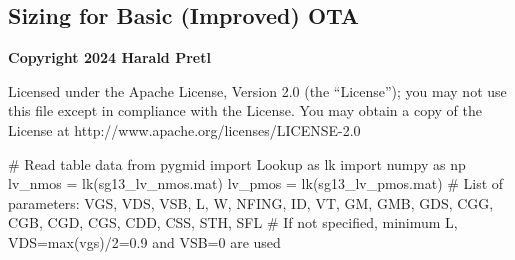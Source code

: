 \documentclass[
  a4paper,
  DIV=11,
  numbers=noendperiod]{scrartcl}
\newenvironment{Shaded}{\begin{snugshade}}{\end{snugshade}}
\newcommand{\CommentTok}[1]{\textcolor[rgb]{0.37,0.37,0.37}{#1}}
\newcommand{\ImportTok}[1]{\textcolor[rgb]{0.00,0.46,0.62}{#1}}
\newcommand{\NormalTok}[1]{\textcolor[rgb]{0.00,0.23,0.31}{#1}}
\newcommand{\OperatorTok}[1]{\textcolor[rgb]{0.37,0.37,0.37}{#1}}
\newcommand{\StringTok}[1]{\textcolor[rgb]{0.13,0.47,0.30}{#1}}
\begin{document}
\begin{tcolorbox}[enhanced jigsaw, titlerule=0mm, left=2mm, coltitle=black, toprule=.15mm, breakable, opacitybacktitle=0.6, colframe=quarto-callout-note-color-frame, bottomtitle=1mm, toptitle=1mm, opacityback=0, colbacktitle=quarto-callout-note-color!10!white, title=\textcolor{quarto-callout-note-color}{\faInfo}\hspace{0.5em}{Improved OTA Sizing}, arc=.35mm, rightrule=.15mm, colback=white, bottomrule=.15mm, leftrule=.75mm]

\section*{Sizing for Basic (Improved)
OTA}\label{sizing-for-basic-improved-ota}

\textbf{Copyright 2024 Harald Pretl}

Licensed under the Apache License, Version 2.0 (the ``License''); you
may not use this file except in compliance with the License. You may
obtain a copy of the License at
http://www.apache.org/licenses/LICENSE-2.0

\begin{Shaded}
\begin{Highlighting}[]
\CommentTok{\# Read table data}
\ImportTok{from}\NormalTok{ pygmid }\ImportTok{import}\NormalTok{ Lookup }\ImportTok{as}\NormalTok{ lk}
\ImportTok{import}\NormalTok{ numpy }\ImportTok{as}\NormalTok{ np}
\NormalTok{lv\_nmos }\OperatorTok{=}\NormalTok{ lk(}\StringTok{\textquotesingle{}sg13\_lv\_nmos.mat\textquotesingle{}}\NormalTok{)}
\NormalTok{lv\_pmos }\OperatorTok{=}\NormalTok{ lk(}\StringTok{\textquotesingle{}sg13\_lv\_pmos.mat\textquotesingle{}}\NormalTok{)}
\CommentTok{\# List of parameters: VGS, VDS, VSB, L, W, NFING, ID, VT, GM, GMB, GDS, CGG, CGB, CGD, CGS, CDD, CSS, STH, SFL}
\CommentTok{\# If not specified, minimum L, VDS=max(vgs)/2=0.9 and VSB=0 are used }
\end{Highlighting}
\end{Shaded}


\end{tcolorbox}
\end{document}
